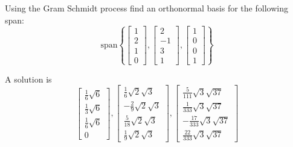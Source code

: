 \documentclass{ximera}
\begin{document}
\begin{problem}\label{prob:use_GS_on_span_2} 
Using the Gram Schmidt process find an
orthonormal basis for the following span:
\[
\mbox{span}\left\{ \left[
\begin{array}{r}
 1 \\
2 \\
1 \\
0
\end{array}
\right]
,\left[
\begin{array}{r}
2 \\
-1 \\
3 \\
1
\end{array}
\right] , \left[
\begin{array}{r}
 1 \\
0 \\
0 \\
1
\end{array}
\right] \right\}
\]
\begin{hint}
A solution is
\[
\left[
\begin{array}{c}
\frac{1}{6}\sqrt{6} \\
\frac{1}{3}\sqrt{6} \\
\frac{1}{6}\sqrt{6} \\
0
\end{array}
\right] ,\left[
\begin{array}{c}
\frac{1}{6}\sqrt{2}\sqrt{3} \\
-\frac{2}{9}\sqrt{2}\sqrt{3} \\
\frac{5}{18}\sqrt{2}\sqrt{3} \\
\frac{1}{9}\sqrt{2}\sqrt{3}
\end{array}
\right] ,\left[
\begin{array}{c}
\frac{5}{111}\sqrt{3}\sqrt{37} \\
\frac{1}{333}\sqrt{3}\sqrt{37} \\
-\frac{17}{333}\sqrt{3}\sqrt{37} \\
\frac{22}{333}\sqrt{3}\sqrt{37}
\end{array}
\right]
\]
\end{hint}
\end{problem}
\end{document}
